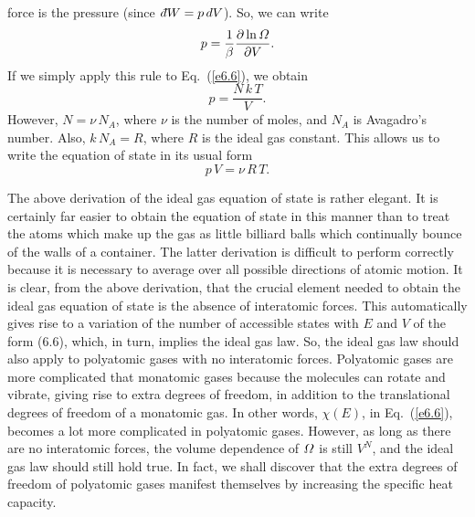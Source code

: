 force is the pressure (since \,$\dbar W =p\,dV$). So, we can write
\begin{equation}
p = \frac{1}{\beta} \frac{\partial \ln {\mit\Omega}}{\partial V}.
\end{equation} 
If we simply apply this rule to Eq.~(\ref{e6.6}), we obtain
\begin{equation}
p = \frac{N\,k\, T}{V}.
\end{equation}
However, $N= \nu \,N_A$, where $\nu$ is the number of moles, and $N_A$ is Avagadro's
number. Also, $k\,N_A = R$, where $R$ is the ideal gas constant. This allows us to
write the equation of state in its usual form
\begin{equation}
p\,V = \nu\, R\,T.
\end{equation}

The above derivation of the ideal gas equation of state
is rather elegant. It is certainly far easier to
 obtain the equation of  state in this manner
than to  treat the atoms which make up the
gas as little billiard balls
which continually 
 bounce of the walls of a container. The latter derivation is difficult  to
perform  correctly  because it is necessary 
to average over all possible directions of
atomic motion. It is clear, from the above derivation, that the crucial element
needed to obtain the ideal gas equation of state is the absence of interatomic forces.
This automatically gives rise to a variation of the number of accessible states
with $E$ and $V$  of
the form (6.6), which, in turn, implies the ideal gas law. So, the ideal gas law
should also apply to polyatomic gases with no interatomic forces. Polyatomic
gases are more complicated that monatomic gases because the molecules can rotate 
and vibrate, giving  rise to extra degrees of freedom, in addition to the
translational degrees of freedom of a monatomic gas. In other words,
$\chi(E)$, in Eq.~(\ref{e6.6}), becomes a lot more complicated
in polyatomic gases. However, as long as there 
are no interatomic forces, the volume dependence of ${\mit\Omega}$ 
is still $V^N$, and the 
ideal gas law should still hold true. In fact, we
shall discover that the extra degrees of freedom of polyatomic gases manifest 
themselves by increasing the specific heat capacity. 

